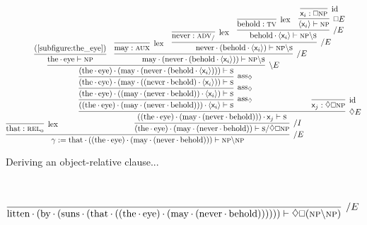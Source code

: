 \begin{figure}
	\centering
	\begin{subfigure}{1\textwidth}
		\smaller
		\[
			\infer[\divright E]{\gamma := \w{that}\sbind((\w{the}\sbind\w{eye})\sbind(\w{may}\sbind(\w{never}\sbind\w{behold}))) \vdash \np\divleft\np}{
				\infer[\Lex]{\w{that} : \subcat{l}{rel}{o}}{}
				&
				\hspace{-40pt}\infer[\divright I]{(\w{the}\sbind\w{eye})\sbind(\w{may}\sbind(\w{never}\sbind\w{behold})) \vdash \s\divright\diamond\bx\np}{
						\infer[\diamond E]{((\w{the}\sbind\w{eye})\sbind(\w{may}\sbind(\w{never}\sbind\w{behold})))\sbind\term{\varj}\vdash \s}{
							\infer[\rulestyle{ass}_{\diamond}]{((\w{the}\sbind\w{eye})\sbind(\w{may}\sbind(\w{never}\sbind\w{behold})))\sbind\bracket{\term{\vari }}\vdash \s}{
								\infer[\rulestyle{ass}_{\diamond}]{(\w{the}\sbind\w{eye})\sbind((\w{may}\sbind(\w{never}\sbind\w{behold}))\sbind\bracket{\term{\vari }})\vdash \s}{
									\infer[\rulestyle{ass}_{\diamond}]{(\w{the}\sbind\w{eye})\sbind(\w{may}\sbind((\w{never}\sbind\w{behold})\sbind\bracket{\term{\vari }}))\vdash \s}{
										\infer[\divleft E]{(\w{the}\sbind\w{eye})\sbind(\w{may}\sbind(\w{never}\sbind(\w{behold}\sbind\bracket{\term{\vari }})))\vdash \s}{
											\infer{\w{the}\sbind\w{eye} \vdash \np}{\text{(\ref{subfigure:the_eye})}}
											&
											\infer[\divright E]{\w{may}\sbind(\w{never}\sbind(\w{behold}\sbind\bracket{\term{\vari }})) \vdash \np\divleft\s}{
												\infer[\Lex]{\w{may} : \gtype{aux}}{}
												&
												\infer[\divright E]{\w{never}\sbind(\w{behold}\sbind\bracket{\term{\vari }}) \vdash \np\divleft\s}{
													\infer[\Lex]{\w{never}:\smallgtype{adv}_{\divright}}{}
													&
													\infer[\divright E]{\w{behold}\sbind{\bracket{\term{\vari }}} \vdash \np\divleft\s}{
														\infer[\Lex]{\w{behold}: \gtype[l]{tv}}{}
														&
														\infer[\bx E]{\bracket{\term{\vari }} \vdash \np}{
															\infer[\Ax]{\term{\vari } : \bx \np}{}
														}
													}
												}
											}
										}
									}
								}
							}						
							&
							\hspace{-52pt}
							\infer[\Ax]{\term{\varj}: \diamond\bx \np}{}
						}
					}
				}
		\]
		\caption{Deriving an object-relative clause...}
		\label{subfigure:lovecraft_rel_clause:rc}
	\end{subfigure}\\[\smallsep]
	\begin{subfigure}{1\textwidth}
		\smaller
		\[
			\infer[\divright E]{\w{litten}\sbind(\w{by}\sbind(\w{suns}\sbind(\w{that}\sbind((\w{the}\sbind\w{eye})\sbind(\w{may}\sbind(\w{never}\sbind\w{behold})))))) \vdash \diamond\bx(\np\divleft\np)}{
}\]
\end{subfigure}
\end{figure}
